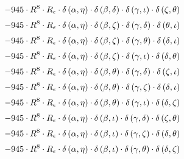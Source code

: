 \begin{subequations}
\begin{gather}
 \\[0.2em] \notag 		 - 945 \cdot R^{8} \cdot R_{\epsilon{}} \cdot \delta{}\left(\alpha{}, \eta{}\right) \cdot \delta{}\left(\beta{}, \delta{}\right) \cdot \delta{}\left(\gamma{}, \iota{}\right) \cdot \delta{}\left(\zeta{}, \theta{}\right) 
 \\[0.2em] \notag 		 - 945 \cdot R^{8} \cdot R_{\epsilon{}} \cdot \delta{}\left(\alpha{}, \eta{}\right) \cdot \delta{}\left(\beta{}, \zeta{}\right) \cdot \delta{}\left(\gamma{}, \delta{}\right) \cdot \delta{}\left(\theta{}, \iota{}\right) 
 \\[0.2em] \notag 		 - 945 \cdot R^{8} \cdot R_{\epsilon{}} \cdot \delta{}\left(\alpha{}, \eta{}\right) \cdot \delta{}\left(\beta{}, \zeta{}\right) \cdot \delta{}\left(\gamma{}, \theta{}\right) \cdot \delta{}\left(\delta{}, \iota{}\right) 
 \\[0.2em] \notag 		 - 945 \cdot R^{8} \cdot R_{\epsilon{}} \cdot \delta{}\left(\alpha{}, \eta{}\right) \cdot \delta{}\left(\beta{}, \zeta{}\right) \cdot \delta{}\left(\gamma{}, \iota{}\right) \cdot \delta{}\left(\delta{}, \theta{}\right) 
 \\[0.2em] \notag 		 - 945 \cdot R^{8} \cdot R_{\epsilon{}} \cdot \delta{}\left(\alpha{}, \eta{}\right) \cdot \delta{}\left(\beta{}, \theta{}\right) \cdot \delta{}\left(\gamma{}, \delta{}\right) \cdot \delta{}\left(\zeta{}, \iota{}\right) 
 \\[0.2em] \notag 		 - 945 \cdot R^{8} \cdot R_{\epsilon{}} \cdot \delta{}\left(\alpha{}, \eta{}\right) \cdot \delta{}\left(\beta{}, \theta{}\right) \cdot \delta{}\left(\gamma{}, \zeta{}\right) \cdot \delta{}\left(\delta{}, \iota{}\right) 
 \\[0.2em] \notag 		 - 945 \cdot R^{8} \cdot R_{\epsilon{}} \cdot \delta{}\left(\alpha{}, \eta{}\right) \cdot \delta{}\left(\beta{}, \theta{}\right) \cdot \delta{}\left(\gamma{}, \iota{}\right) \cdot \delta{}\left(\delta{}, \zeta{}\right) 
 \\[0.2em] \notag 		 - 945 \cdot R^{8} \cdot R_{\epsilon{}} \cdot \delta{}\left(\alpha{}, \eta{}\right) \cdot \delta{}\left(\beta{}, \iota{}\right) \cdot \delta{}\left(\gamma{}, \delta{}\right) \cdot \delta{}\left(\zeta{}, \theta{}\right) 
 \\[0.2em] \notag 		 - 945 \cdot R^{8} \cdot R_{\epsilon{}} \cdot \delta{}\left(\alpha{}, \eta{}\right) \cdot \delta{}\left(\beta{}, \iota{}\right) \cdot \delta{}\left(\gamma{}, \zeta{}\right) \cdot \delta{}\left(\delta{}, \theta{}\right) 
 \\[0.2em] \notag 		 - 945 \cdot R^{8} \cdot R_{\epsilon{}} \cdot \delta{}\left(\alpha{}, \eta{}\right) \cdot \delta{}\left(\beta{}, \iota{}\right) \cdot \delta{}\left(\gamma{}, \theta{}\right) \cdot \delta{}\left(\delta{}, \zeta{}\right) 

\end{gather}
\end{subequations}
